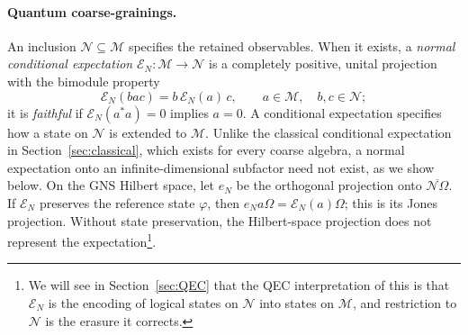 \documentclass[a4paper,11pt]{article}
\theoremstyle{definition}
\newcommand{\mE}{\mathcal{E}}
\begin{document}
\paragraph{Quantum coarse-grainings.}
An inclusion $\mathcal N\subseteq\mathcal M$ specifies the retained observables.
When it exists, a \emph{normal conditional expectation}
$\mE_N:\mathcal M\to\mathcal N$ is a completely positive, unital projection
with the bimodule property
\begin{equation}
 \mE_N(bac)=b\,\mE_N(a)\,c,
 \qquad a\in\mathcal M,\quad b,c\in\mathcal N;
 \label{eq:CE-bimodular}
\end{equation}
it is \emph{faithful} if $\mE_N(a^*a)=0$ implies $a=0$. A conditional expectation specifies how a state on $\mathcal N$ is extended to $\mathcal M$.
Unlike the classical conditional expectation in Section~\ref{sec:classical}, which exists for every coarse algebra,
a normal expectation onto an infinite-dimensional subfactor need not exist, as we show below. On the GNS Hilbert space, let $e_N$
be the orthogonal projection onto $\overline{\mathcal N\Omega}$.
If $\mE_N$ preserves the reference state $\varphi$, then
$e_Na\Omega=\mE_N(a)\Omega$; this is its Jones projection.
Without state preservation, the Hilbert-space projection does not represent the expectation\footnote{We will see in Section~\ref{sec:QEC} that the QEC interpretation of this is that $\mE_N$ is the encoding of logical states on $\mathcal N$
into states on $\mathcal M$, and restriction to $\mathcal N$ is the erasure it corrects.}.
\end{document}
